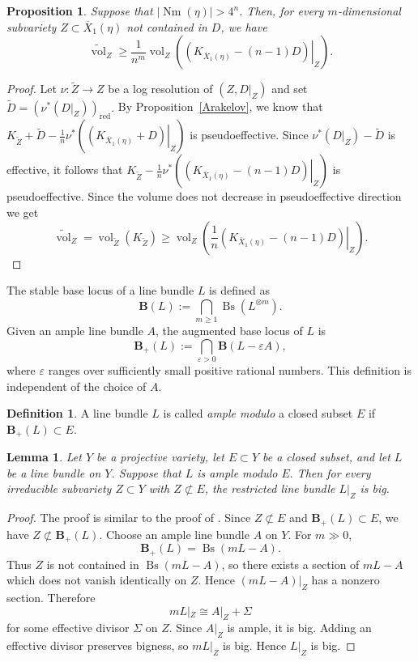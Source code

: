 \documentclass[12 pt]{amsart}
\newtheorem{Lemma}[theorem]{Lemma}
\newtheorem{Proposition}[theorem]{Proposition}
\theoremstyle{definition}
\newtheorem{definition}[theorem]{Definition}
\newcommand{\Nm}{\operatorname{Nm}}
\begin{document}
\begin{Proposition}\label{Canonical vol est}
Suppose that $|\Nm(\eta)|>4^n$. Then, for every $m$-dimensional subvariety $Z\subset\overline X_1(\eta)$ not contained in $D$, we have
\[\widetilde{\operatorname{vol}}_{Z}
\geq
\frac{1}{n^m}
\operatorname{vol}_{Z}\left(
\left.(K_{\overline X_1(\eta)}-(n-1)D)\right|_Z
\right).
\]
\end{Proposition}

\begin{proof}
Let $\nu:\widetilde Z\to Z$ be a log resolution of $(Z,D|_Z)$ and set
\(
\widetilde D=(\nu^*(D|_Z))_{\mathrm{red}}.
\)
By Proposition~\ref{Arakelov}, we know that
\(
K_{\widetilde Z}+\widetilde D
-\frac1n\nu^*
\left(\left.(K_{\overline X_1(\eta)}+D)\right|_Z\right)
\)
is pseudoeffective. Since
\(
\nu^*(D|_Z)-\widetilde D
\)
is effective, it follows that
\(
K_{\widetilde Z}
-\frac1n\nu^*
\left(\left.(K_{\overline X_1(\eta)}-(n-1)D)\right|_Z\right)
\)
is pseudoeffective. Since the volume does not decrease in pseudoeffective direction we get 
\[
\widetilde{\operatorname{vol}}_{Z}
=
\operatorname{vol}_{\widetilde Z}(K_{\widetilde Z})
\geq
\operatorname{vol}_{Z}\left(
\frac1n\left.(K_{\overline X_1(\eta)}-(n-1)D)\right|_Z
\right).
\]
\end{proof}
The stable base locus of a line bundle $L$ is defined as
\[
\mathbf B(L):=\bigcap_{m\ge1}\operatorname{Bs}(L^{\otimes m}).
\]
Given an ample line bundle $A$, the augmented base locus of $L$ is
\[
\mathbf B_+(L)
:=
\bigcap_{\varepsilon>0}
\mathbf B(L-\varepsilon A),
\]
where $\varepsilon$ ranges over sufficiently small positive rational
numbers. This definition is independent of the choice of $A$. 
\begin{definition}\label{ample mod def} A line bundle $L$ is called \emph{ample modulo} a closed subset $E$ if
\(
\mathbf B_+(L)\subset E.
\)    
\end{definition}

\begin{Lemma}\label{ample rest} Let $Y$ be a projective variety, let $E\subset Y$ be a closed subset, and let $L$ be a line bundle on $Y$. Suppose that $L$ is ample modulo $E.$
Then for every irreducible subvariety $Z\subset Y$ with $Z\not\subset E$, the restricted line bundle $L|_Z$ is big.
 
\end{Lemma}
\begin{proof}  The proof is similar to the proof of \cite[Lemma 4.7]{memariansorkhabi2022positivity}.
Since $Z\not\subset E$ and $\mathbf B_+(L)\subset E$, we have
\(
Z\not\subset \mathbf B_+(L).
\)
Choose an ample line bundle $A$ on $Y$. For $m\gg 0$,
\[
\mathbf B_+(L)=\operatorname{Bs}(mL-A).
\]
Thus $Z$ is not contained in $\operatorname{Bs}(mL-A)$, so there exists a section of $mL-A$ which does not vanish identically on $Z$. Hence
\(
(mL-A)|_Z
\)
has a nonzero section. Therefore
\[
mL|_Z \cong A|_Z+\Sigma
\]
for some effective divisor $\Sigma$ on $Z$. Since $A|_Z$ is ample, it is big. Adding an effective divisor preserves bigness, so $mL|_Z$ is big. Hence $L|_Z$ is big.
\end{proof}
\end{document}
